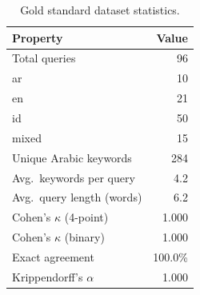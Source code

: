 \begin{table}[t]
\centering
\caption{Gold standard dataset statistics.}
\label{tab:gold-standard}
\begin{tabular}{lr}
\toprule
Property & Value \\
\midrule
Total queries & 96 \\
\quad ar & 10 \\
\quad en & 21 \\
\quad id & 50 \\
\quad mixed & 15 \\
Unique Arabic keywords & 284 \\
Avg.\ keywords per query & 4.2 \\
Avg.\ query length (words) & 6.2 \\
\midrule
Cohen's $\kappa$ (4-point) & 1.000 \\
Cohen's $\kappa$ (binary) & 1.000 \\
Exact agreement & 100.0\% \\
Krippendorff's $\alpha$ & 1.000 \\
\bottomrule
\end{tabular}
\end{table}
